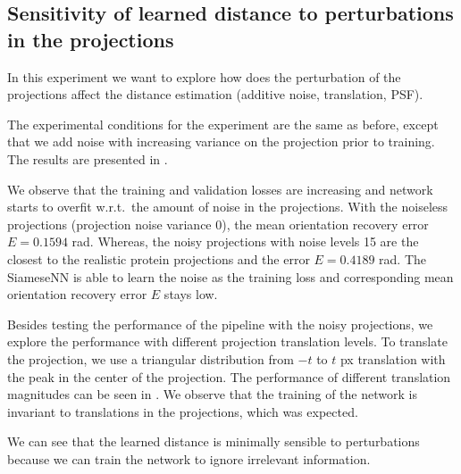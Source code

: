 
\subsection{Sensitivity of learned distance to perturbations in the projections}\label{sec:results:distance-estimation:sensitivity}


In this experiment we want to explore how does the perturbation of the projections affect the distance estimation (additive noise, translation, PSF).

The experimental conditions for the experiment are the same as before, except that we add noise with increasing variance on the projection prior to training.
The results are presented in .

We observe that the training and validation losses are increasing and network starts to overfit w.r.t.\ the amount of noise in the projections.
With the noiseless projections (projection noise variance 0), the mean orientation recovery error $E = 0.1594$ rad.
Whereas, the noisy projections with noise levels 15 are the closest to the realistic protein projections and the error $E=0.4189$ rad.
The SiameseNN is able to learn the noise as the training loss and corresponding mean orientation recovery error $E$ stays low.

Besides testing the performance of the pipeline with the noisy projections, we explore the performance with different projection translation levels.
To translate the projection, we use a triangular distribution from $-t$ to $t$ px translation with the peak in the center of the projection.
The performance of different translation magnitudes can be seen in .
We observe that the training of the network is invariant to translations in the projections, which was expected.

We can see that the learned distance is minimally sensible to perturbations because we can train the network to ignore irrelevant information.



